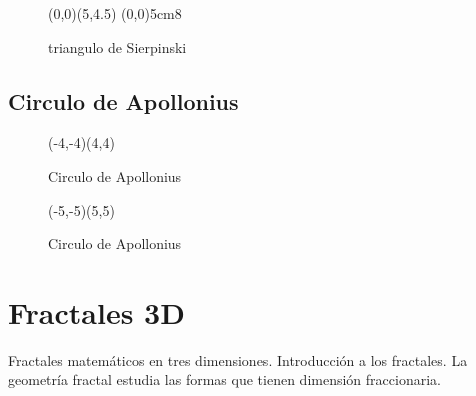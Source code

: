 \begin{figure}[!ht]
	\begin{center}
		\begin{pspicture}[showgrid=true](0,0)(5,4.5)
			\psSier[linecolor=black,](0,0){5cm}{8}
		\end{pspicture}
	\end{center}
	\caption{triangulo de Sierpinski}
\end{figure}


\subsection{Circulo de Apollonius}

\begin{figure}[!ht]
	\begin{center}
		\begin{pspicture}[showgrid=true,linewidth=9pt](-4,-4)(4,4)
			\psAppolonius[Radius=4cm]
		\end{pspicture}
	\end{center}
	\caption{Circulo de Apollonius}
\end{figure}

\begin{figure}[!ht]
	\begin{center}
		\begin{pspicture}[showgrid=true,linewidth=9pt](-5,-5)(5,5)
			\psAppolonius[Radius=5cm,Color]
		\end{pspicture}
	\end{center}
	\caption{Circulo de Apollonius}
\end{figure}




\section{Fractales 3D}


Fractales matemáticos en tres dimensiones. Introducción a los fractales. La geometría fractal estudia las formas que tienen dimensión fraccionaria.


